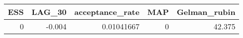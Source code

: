 \begin{longtable}{rrrrr}
\toprule
ESS & LAG\_30 & acceptance\_rate & MAP & Gelman\_rubin \\ 
\midrule
0 & -0.004 & 0.01041667 & 0 & 42.375 \\ 
\bottomrule
\end{longtable}

